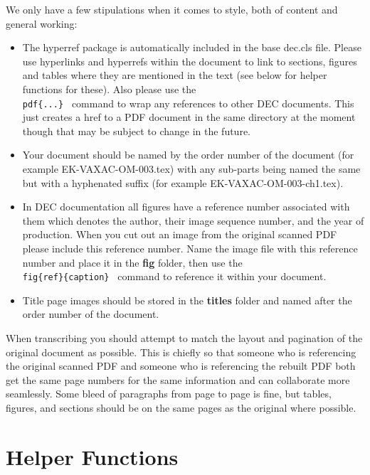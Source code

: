 \documentclass{decsectional}
\begin{document}
We only have a few stipulations when it comes to style, both of content and general working:

\begin{itemize}

\item	The hyperref package is automatically included in the base dec.cls file. Please use hyperlinks and hyperrefs within the document
		to link to sections, figures and tables where they are mentioned in the text (see below for helper functions for these). 
		Also please use the {\tt \\pdf\{...\}\ } command to
		wrap any references to other DEC documents. This just creates a href to a PDF document in the same directory at the moment though
		that may be subject to change in the future.

\item	Your document should be named by the order number of the document (for example EK-VAXAC-OM-003.tex) with any sub-parts being named the same but
		with a hyphenated suffix (for example EK-VAXAC-OM-003-ch1.tex).

\item	In DEC documentation all figures have a reference number associated with them which denotes the author, their image sequence number, and the
		year of production. When you cut out an image from the original scanned PDF please include this reference number. Name the image file with
		this reference number and place it in the \textbf{fig} folder, then use the {\tt \\fig\{ref\}\{caption\}\ } command to reference it within
		your document.

\item	Title page images should be stored in the \textbf{titles} folder and named after the order number of the document.

\end{itemize}

When transcribing you should attempt to match the layout and pagination of the original document as possible. This is chiefly so that someone
who is referencing the original scanned PDF and someone who is referencing the rebuilt PDF both get the same page numbers for the same information and
can collaborate more seamlessly. Some bleed of paragraphs from page to page is fine, but tables, figures, and sections should be on the same pages
as the original where possible.

\chapter{Helper Functions}
\end{document}
